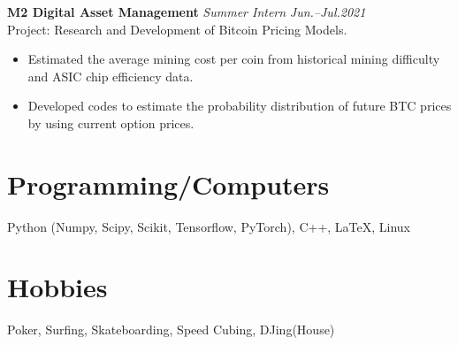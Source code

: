 \documentclass[11pt,a4paper,roman]{moderncv}        %
\begin{document}
\textbf{M2 Digital Asset Management} \textit{Summer Intern} \hfill \textit{Jun.--Jul.2021}
\vspace*{1mm}\\
{Project: Research and Development of Bitcoin Pricing Models.}
\vspace*{1mm}
\begin{itemize}
	\item Estimated the average mining cost per coin from historical mining difficulty and ASIC chip efficiency data.
	\item Developed codes to estimate the probability distribution of future BTC prices by using current option prices.
\end{itemize}

\section{Programming/Computers}
{Python (Numpy, Scipy, Scikit, Tensorflow, PyTorch), C++, \LaTeX, Linux}

\section{Hobbies}
{Poker, Surfing, Skateboarding, Speed Cubing, DJing(House)}
\end{document}
